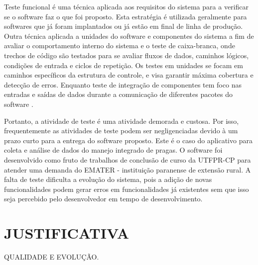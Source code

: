 Teste funcional é uma técnica aplicada aos requisitos do sistema para a verificar se o software faz o que foi proposto. Esta estratégia é utilizada geralmente para softwares que já foram implantados ou já estão em final de linha de produção. Outra técnica aplicada a unidades do software e componentes do sistema a fim de avaliar o comportamento interno do sistema e o teste de caixa-branca, onde trechos de código são testados para se avaliar fluxos de dados, caminhos lógicos, condições de entrada e ciclos de repetição. Os testes em unidades se focam em caminhos específicos da estrutura de controle, e visa garantir máxima cobertura e detecção de erros. Enquanto teste de integração de componentes tem foco nas entradas e saídas de dados durante a comunicação de diferentes pacotes do software \cite{PRESMA2016}.  


Portanto, a atividade de teste é uma atividade demorada e custosa. Por isso, frequentemente as atividades de teste podem ser negligenciadas devido à um prazo curto para a entrega do software proposto. Este é o caso do aplicativo para coleta e análise de dados do manejo integrado de pragas. O software foi desenvolvido como fruto de trabalhos de conclusão de curso da UTFPR-CP para atender uma demanda do EMATER - instituição paranense de extensão rural. A falta de teste dificulta a evolução do sistema, pois a adição de novas funcionalidades podem gerar erros em funcionalidades já existentes sem que isso seja percebido pelo desenvolvedor em tempo de desenvolvimento. 

\section{JUSTIFICATIVA}

QUALIDADE E EVOLUÇÃO.


